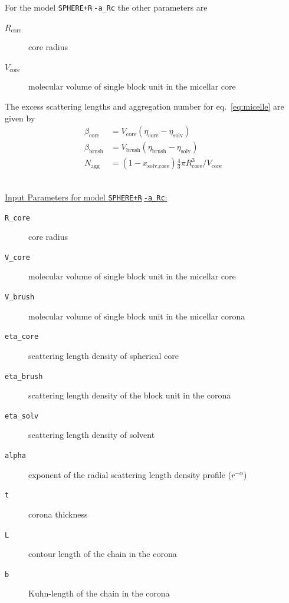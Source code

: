 \clearpage

\noindent
For the model \texttt{SPHERE+R$\hat{~}$-a\_Rc} the other parameters are
\begin{description}
\item[$R_\text{core}$] core radius
\item[$V_\text{core}$] molecular volume of single block unit in the micellar core
\end{description}
The excess scattering lengths and aggregation number for eq.\
\ref{eq:micelle} are given by
\begin{align}
\beta_\text{core}  &= V_\text{core}  (\eta_\text{core} -\eta_\text{solv}) \\
\beta_\text{brush} &= V_\text{brush} (\eta_\text{brush}-\eta_\text{solv}) \\
N_\text{agg} &= (1-x_\text{solv,core}) \frac{4}{3}\pi R_\text{core}^3  / V_\text{core}
\end{align}

\hspace{1pt}\\
\uline{Input Parameters for model \texttt{SPHERE+R$\hat{~}$-a\_Rc}:}
\begin{description}
\item[\texttt{R\_core}] core radius
\item[\texttt{V\_core}] molecular volume of single block unit in the micellar core
\item[\texttt{V\_brush}]  molecular volume of single block unit in the micellar corona
\item[\texttt{eta\_core}] scattering length density of spherical core
\item[\texttt{eta\_brush}] scattering length density of the block unit in the corona
\item[\texttt{eta\_solv}] scattering length density of solvent
\item[\texttt{alpha}] exponent of the radial scattering length density profile ($r^{-\alpha}$)
\item[\texttt{t}] corona thickness
\item[\texttt{L}] contour length of the chain in the corona
\item[\texttt{b}] Kuhn-length of the chain in the corona
\end{description}

\vspace{10mm}

